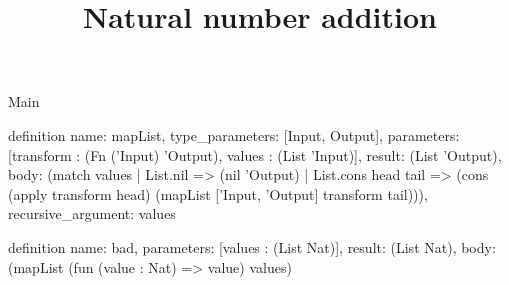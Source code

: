 \begin{lexlean}{Main}
\title{Natural number addition}
\begin{semanticmodule}
definition{
  name: mapList,
  type_parameters: [Input, Output],
  parameters: [transform : (Fn ('Input) 'Output), values : (List 'Input)],
  result: (List 'Output),
  body: (match values
    | List.nil => (nil 'Output)
    | List.cons head tail => (cons (apply transform head) (mapList ['Input, 'Output] transform tail))),
  recursive_argument: values
}

definition{
  name: bad,
  parameters: [values : (List Nat)],
  result: (List Nat),
  body: (mapList (fun (value : Nat) => value) values)
}
\end{semanticmodule}
\end{lexlean}
